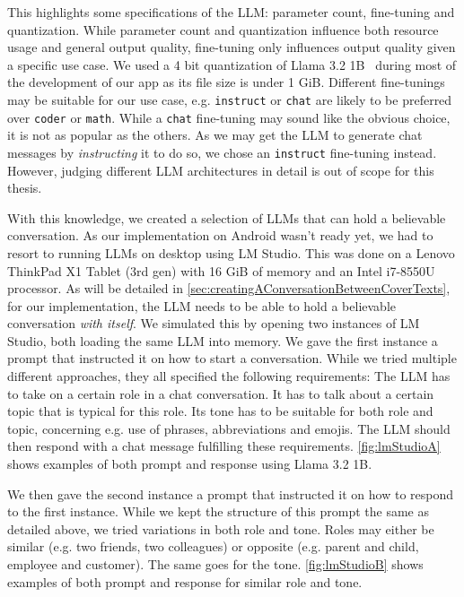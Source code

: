 This highlights some specifications of the \gls{LLM}: parameter count, fine-tuning and quantization. While parameter count and quantization influence both resource usage and general output quality, fine-tuning only influences output quality given a specific use case. We used a 4 bit quantization of Llama 3.2 1B~\cite{huggingquantsHuggingquantsLlama321BInstructQ4_K_MGGUFHugging2024} during most of the development of our app as its file size is under 1 GiB. Different fine-tunings may be suitable for our use case, e.g. \lstinline|instruct| or \lstinline|chat| are likely to be preferred over \lstinline|coder| or \lstinline|math|. While a \lstinline|chat| fine-tuning may sound like the obvious choice, it is not as popular as the others. As we may get the \gls{LLM} to generate chat messages by \textit{instructing} it to do so, we chose an \lstinline|instruct| fine-tuning instead. However, judging different \gls{LLM} architectures in detail is out of scope for this thesis.

With this knowledge, we created a selection of \glspl{LLM} that can hold a believable conversation. As our implementation on Android wasn't ready yet, we had to resort to running \glspl{LLM} on desktop using LM Studio. This was done on a Lenovo ThinkPad X1 Tablet (3rd gen) with 16 GiB of memory and an Intel i7-8550U processor. As will be detailed in \cref{sec:creatingAConversationBetweenCoverTexts}, for our implementation, the \gls{LLM} needs to be able to hold a believable conversation \textit{with itself}. We simulated this by opening two instances of LM Studio, both loading the same \gls{LLM} into memory. We gave the first instance a prompt that instructed it on how to start a conversation. While we tried multiple different approaches, they all specified the following requirements: The \gls{LLM} has to take on a certain role in a chat conversation. It has to talk about a certain topic that is typical for this role. Its tone has to be suitable for both role and topic, concerning e.g. use of phrases, abbreviations and emojis. The \gls{LLM} should then respond with a chat message fulfilling these requirements. \cref{fig:lmStudioA} shows examples of both prompt and response using Llama 3.2 1B.

We then gave the second instance a prompt that instructed it on how to respond to the first instance. While we kept the structure of this prompt the same as detailed above, we tried variations in both role and tone. Roles may either be similar (e.g. two friends, two colleagues) or opposite (e.g. parent and child, employee and customer). The same goes for the tone. \cref{fig:lmStudioB} shows examples of both prompt and response for similar role and tone.

